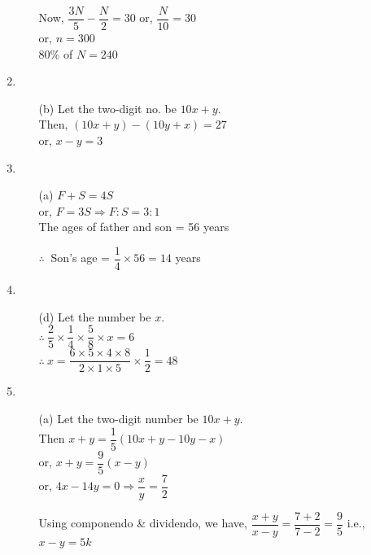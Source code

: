 \begin{multicols}{2}
\begin{enumerate}
\begin{itemize}
    Now, $\dfrac{3N}{5} - \dfrac{N}{2} = 30$ or, $\dfrac{N}{10} = 30$\\
    or, $n = 300$\\
    $80\%$ of $N = 240$\\
  \end{itemize}
\item
  \begin{itemize}
  \item[(b)] Let the two-digit no. be $10x + y$.\\
    Then, $(10x + y)-(10y + x) = 27$\\
    or, $x - y = 3$
  \end{itemize}
\item
  \begin{itemize}
  \item[(a)] $F + S = 4S$\\
    or, $F = 3S \Rightarrow F : S = 3: 1$\\
    The ages of father and son = 56 years

    $\therefore~$ Son's age = $\dfrac{1}{4} \times 56 = 14$ years
  \end{itemize}
\item
  \begin{itemize}
  \item[(d)] Let the number be $x$.\\
    $\therefore~ \dfrac{2}{5} \times \dfrac{1}{4} \times \dfrac{5}{8} \times x = 6$\\
    $\therefore~ x = \dfrac{6 \times 5 \times 4 \times 8}{2 \times 1 \times 5} \times \dfrac{1}{2} = 48$
  \end{itemize}
\item
  \begin{itemize}
  \item[(a)] Let the two-digit number be $10x + y$.\\
    Then $x + y = \dfrac{1}{5}(10x + y - 10y - x)$\\
    or, $x + y = \dfrac{9}{5} (x - y)$\\
    or, $4x - 14y = 0 \Rightarrow \dfrac{x}{y} = \dfrac{7}{2}$

    Using componendo \& dividendo, we have,
    $\dfrac{x + y}{x - y} = \dfrac{7 + 2}{7 - 2} = \dfrac{9}{5}$ i.e., $x - y = 5k$


\end{itemize}
\end{enumerate}
\end{multicols}

